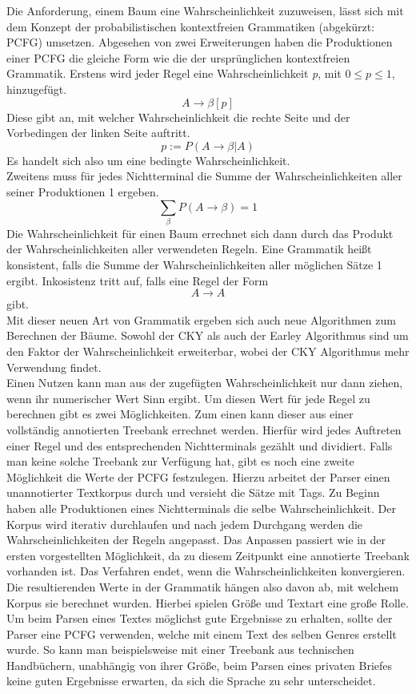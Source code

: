 Die Anforderung, einem Baum eine Wahrscheinlichkeit zuzuweisen, lässt sich mit dem Konzept der probabilistischen kontextfreien Grammatiken (abgekürzt: PCFG) umsetzen. Abgesehen von zwei Erweiterungen haben die Produktionen einer PCFG die gleiche Form wie die der ursprünglichen kontextfreien Grammatik. Erstens wird jeder Regel eine Wahrscheinlichkeit \textit{p}, mit \( 0 \leq p \leq 1 \), hinzugefügt.
\[ A \to \beta  [p] \]
Diese gibt an, mit welcher Wahrscheinlichkeit die rechte Seite und der Vorbedingen der linken Seite auftritt.
\[ p := P(A \to \beta | A) \] 
Es handelt sich also um eine bedingte Wahrscheinlichkeit.\\ 
Zweitens muss für jedes Nichtterminal die Summe der Wahrscheinlichkeiten aller seiner Produktionen 1 ergeben.
\[ \sum_{\beta} P(A \to \beta) = 1 \] 
Die Wahrscheinlichkeit für einen Baum errechnet sich dann durch das Produkt der Wahrscheinlichkeiten aller verwendeten Regeln. Eine Grammatik heißt konsistent, falls die Summe der Wahrscheinlichkeiten aller möglichen Sätze 1 ergibt. Inkosistenz tritt auf, falls eine Regel der Form 
\[ A \to A \]
gibt.\\
Mit dieser neuen Art von Grammatik ergeben sich auch neue Algorithmen zum Berechnen der Bäume. Sowohl der CKY als auch der Earley Algorithmus sind um den Faktor der Wahrscheinlichkeit erweiterbar, wobei der CKY Algorithmus mehr Verwendung findet.\\ %
Einen Nutzen kann man aus der zugefügten Wahrscheinlichkeit nur dann ziehen, wenn ihr numerischer Wert Sinn ergibt. Um diesen Wert für jede Regel zu berechnen gibt es zwei Möglichkeiten. Zum einen kann dieser aus einer vollständig annotierten Treebank errechnet werden. Hierfür wird jedes Auftreten einer Regel und des entsprechenden Nichtterminals gezählt und dividiert. 
Falls man keine solche Treebank zur Verfügung hat, gibt es noch eine zweite Möglichkeit die Werte der PCFG festzulegen. Hierzu arbeitet der Parser einen unannotierter Textkorpus durch und versieht die Sätze mit Tags. Zu Beginn haben alle Produktionen eines Nichtterminals die selbe Wahrscheinlichkeit. Der Korpus wird iterativ durchlaufen und nach jedem Durchgang werden die Wahrscheinlichkeiten der Regeln angepasst. Das Anpassen passiert wie in der ersten vorgestellten Möglichkeit, da zu diesem Zeitpunkt eine annotierte Treebank vorhanden ist. Das Verfahren endet, wenn die Wahrscheinlichkeiten konvergieren. \\
Die resultierenden Werte in der Grammatik hängen also davon ab, mit welchem Korpus sie berechnet wurden. Hierbei spielen Größe und Textart eine große Rolle. Um beim Parsen eines Textes möglichst gute Ergebnisse zu erhalten, sollte der Parser eine PCFG verwenden, welche mit einem Text des selben Genres erstellt wurde. So kann man beispielsweise mit einer Treebank aus technischen Handbüchern, unabhängig von ihrer Größe, beim Parsen eines privaten Briefes keine guten Ergebnisse erwarten, da sich die Sprache zu sehr unterscheidet.\\ %
